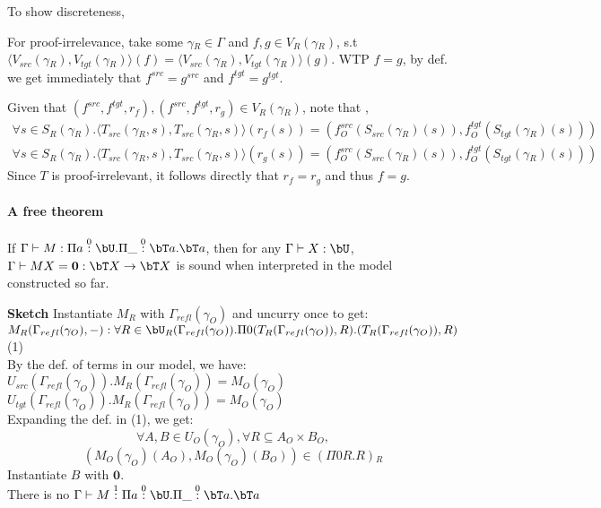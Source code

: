 \documentclass[12pt,a4paper]{article}
\def\src{_{src}}\alwaysmath{src}
\def\rfl{_{refl}}\alwaysmath{rfl}
\def\tgt{_{tgt}}\alwaysmath{tgt}
\renewcommand{\O}{_{O}}
\newcommand{\R}{\ensuremath{_{R}}}
\begin{document}
To show discreteness, 

For proof-irrelevance, take some $\gamma\R \in \Gamma$ and $f , g \in V\R(\gamma\R)$, s.t $\langle V\src(\gamma\R), V\tgt(\gamma\R) \rangle (f) = \langle V\src(\gamma\R), V\tgt(\gamma\R) \rangle (g)$. WTP $f = g$, by def. we get immediately that $f^{src} = g^{src}$ and $f^{tgt} = g^{tgt}$. 

Given that $(f^{src}, f^{tgt}, r_f), (f^{src}, f^{tgt}, r_g) \in V\R(\gamma\R)$, note that , 
\begin{align*}
  \forall s \in S\R(\gamma\R). \langle T\src(\gamma\R, s), T\src(\gamma\R, s) \rangle  ( r_f(s)) = (f\O^{src}(S\src(\gamma\R)(s)), f\O^{tgt}(S\tgt(\gamma\R)(s)))\\
  \forall s \in S\R(\gamma\R). \langle T\src(\gamma\R, s), T\src(\gamma\R, s) \rangle  ( r_g(s)) = (f\O^{src}(S\src(\gamma\R)(s)), f\O^{tgt}(S\tgt(\gamma\R)(s)))
\end{align*}
Since $T$ is proof-irrelevant, it follows directly that $r_f = r_g$ and thus $f = g$. 

\paragraph{A free theorem}
\begin{thm}
  If $\Gamma \vdash M : \Pi a \overset{0}{:} \bU . \Pi \_ \overset{0}{:} \bT a . \bT a$, 
  then for any $\Gamma \vdash X : \bU$, $\Gamma \vdash M X  = \mathbf{0} : \bT X \to \bT X$ is sound when interpreted in the model constructed so far.
\end{thm}
\textbf{Sketch } Instantiate $M\R$ with $\Gamma\rfl(\gamma\O)$ and uncurry once to get:\\
$M\R(\Gamma\rfl(\gamma\O), -): \forall R \in \bU\R(\Gamma\rfl(\gamma\O)). \Pi 0 (T\R(\Gamma\rfl(\gamma\O)), R) . (T\R(\Gamma\rfl(\gamma\O)), R)$ (1)\\
By the def. of terms in our model, we have:\\
$U\src(\Gamma\rfl(\gamma\O)). M\R(\Gamma\rfl(\gamma\O)) = M\O(\gamma\O)$\\
$U\tgt(\Gamma\rfl(\gamma\O)). M\R(\Gamma\rfl(\gamma\O)) = M\O(\gamma\O)$\\
Expanding the def. in (1), we get:\\
$$\forall A, B \in U\O(\gamma\O), \forall R \subseteq A\O \times B\O,$$
$$(M\O(\gamma\O)(A\O),  M\O(\gamma\O)(B\O) ) \in (\Pi 0 R . R)\R$$
Instantiate $B$ with $\mathbf{0}$.\\



There is no $\Gamma \vdash M \overset{1}{:}\Pi a \overset{0}{:} \bU . \Pi \_ \overset{0}{:} \bT a . \bT a$







%
\printbibliography
\end{document}
